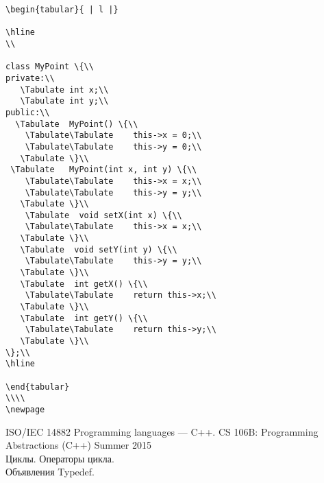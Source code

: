 \documentclass{article}
\begin{document}
\begin{lstlisting}
\begin{tabular}{ | l |}

\hline
\\

class MyPoint \{\\
private:\\
   \Tabulate int x;\\
   \Tabulate int y;\\
public:\\
  \Tabulate  MyPoint() \{\\
    \Tabulate\Tabulate    this->x = 0;\\
    \Tabulate\Tabulate    this->y = 0;\\
   \Tabulate \}\\
 \Tabulate   MyPoint(int x, int y) \{\\
    \Tabulate\Tabulate    this->x = x;\\
    \Tabulate\Tabulate    this->y = y;\\
   \Tabulate \}\\
    \Tabulate  void setX(int x) \{\\
    \Tabulate\Tabulate    this->x = x;\\
   \Tabulate \}\\
   \Tabulate  void setY(int y) \{\\
    \Tabulate\Tabulate    this->y = y;\\
   \Tabulate \}\\
   \Tabulate  int getX() \{\\
    \Tabulate\Tabulate    return this->x;\\
   \Tabulate \}\\
   \Tabulate  int getY() \{\\
    \Tabulate\Tabulate    return this->y;\\
   \Tabulate \}\\
\};\\
\hline

\end{tabular}
\\\\
\newpage

\end{lstlisting}
\begin{thebibliography}{1}
ISO/IEC 14882 Programming languages — C++.
CS 106B: Programming Abstractions (C++)
Summer 2015 \\ [http://stanford.edu/class/archive/cs/cs106b/cs106b.1158/styleguide.shtml]
Циклы. Операторы цикла. \\
[https://www.bestprog.net/ru/2017/09/04/cycles-operators-of-the-cycle-for-while-do-while\_ru/]
Объявления Typedef.\\
[https://docs.microsoft.com/ru-ru/cpp/c-language/typedef-declarations?view=msvc-16]
\end{thebibliography}

\end{document}
